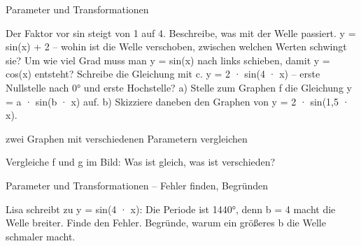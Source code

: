 \begin{aufgabe}{Parameter und Transformationen}
\begin{teile}
\begin{ksys}[xmin=0,xmax=360,ymin=-3,ymax=3,xstep=45,ystep=1,ablesen]\end{ksys}
\teil Der Faktor vor sin steigt von 1 auf 4. Beschreibe, was mit der Welle passiert.
\teil y = sin(x) + 2 – wohin ist die Welle verschoben, zwischen welchen Werten schwingt sie? \leerfeld
\teil Um wie viel Grad muss man y = sin(x) nach links schieben, damit y = cos(x) entsteht? Schreibe die Gleichung mit c. \leerfeld
\teil y = 2 · sin(4 · x) – erste Nullstelle nach 0° und erste Hochstelle? \leerfeld
\teil a) Stelle zum Graphen f die Gleichung y = a · sin(b · x) auf. b) Skizziere daneben den Graphen von y = 2 · sin(1,5 · x).

\begin{ksys}[xmin=0,xmax=360,ymin=-4,ymax=4,xstep=45,ystep=1,ablesen]\end{ksys} \begin{ksys}[xmin=0,xmax=480,ymin=-3,ymax=3,xstep=60,ystep=1]\end{ksys}
\end{teile}
\end{aufgabe}

\begin{aufgabe}{zwei Graphen mit verschiedenen Parametern vergleichen}
\begin{teile}
\teil Vergleiche f und g im Bild: Was ist gleich, was ist verschieden?

\begin{ksys}[xmin=0,xmax=360,ymin=-3,ymax=3,xstep=45,ystep=1,ablesen]\end{ksys}
\end{teile}
\end{aufgabe}

\begin{aufgabe}{Parameter und Transformationen – Fehler finden, Begründen}
\begin{teile}
\teil Lisa schreibt zu y = sin(4 · x): Die Periode ist 1440°, denn b = 4 macht die Welle breiter. Finde den Fehler.
\teil Begründe, warum ein größeres b die Welle schmaler macht.
\end{teile}
\end{aufgabe}

